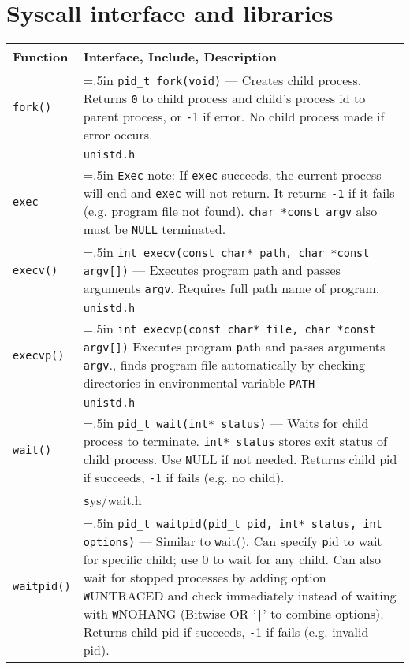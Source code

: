 \documentclass{article}
\newcommand{\indenth}[1][.5]{\hangindent=#1in
                         \hangafter=1 }
\begin{document}
\section{Syscall interface and libraries}
\begin{longtabu}{p{1in}|p{5.7in}}
    \bf Function & \textbf{Interface, Include, Description}
        \\ \hline
    \texttt{fork()} &  \indenth\texttt{pid\_t fork(void)} --- Creates child process. Returns \texttt 0 to child process and child's process id to parent process, or \texttt -1 if error. No child process made if error occurs.
        \\
    & \texttt{unistd.h}
        \\ \hline
    \texttt{exec} & \indenth\texttt{Exec} note: If \texttt{exec} succeeds, the current process will end and \texttt{exec} will not return. It returns \texttt{-1} if it fails (e.g. program file not found). \texttt{char *const argv} also must be \texttt{NULL} terminated. \par
        \\
    \texttt{execv()} & \indenth\texttt{int execv(const char* path, char *const argv[])} --- Executes program \texttt path and passes arguments \texttt{argv}. Requires full path name of program.
        \\
    & \texttt{unistd.h}
        \\
    \texttt{execvp()} & \indenth\texttt{int execvp(const char* file, char *const argv[])} Executes program \texttt path and passes arguments \texttt{argv}., finds program file automatically by checking directories in environmental variable \texttt{PATH}
        \\
    & \texttt{unistd.h}
        \\ \hline
    \texttt{wait()} & \indenth\texttt{pid\_t wait(int* status)} --- Waits for child process to terminate. \texttt{int* status} stores exit status of child process. Use \texttt NULL if not needed. Returns child pid if succeeds, \texttt -1 if fails (e.g. no child). 
        \\
    & \texttt sys/wait.h
        \\
    \texttt{waitpid()} & \indenth\texttt{pid\_t waitpid(pid\_t pid, int* status, int options)} --- Similar to \texttt wait(). Can specify \texttt pid to wait for specific child; use 0 to wait for any child. Can also wait for stopped processes by adding option \texttt WUNTRACED and check immediately instead of waiting with \texttt WNOHANG (Bitwise OR '\texttt{|}' to combine options). Returns child pid if succeeds, \texttt -1 if fails (e.g. invalid pid).

\end{longtabu}
\end{document}
